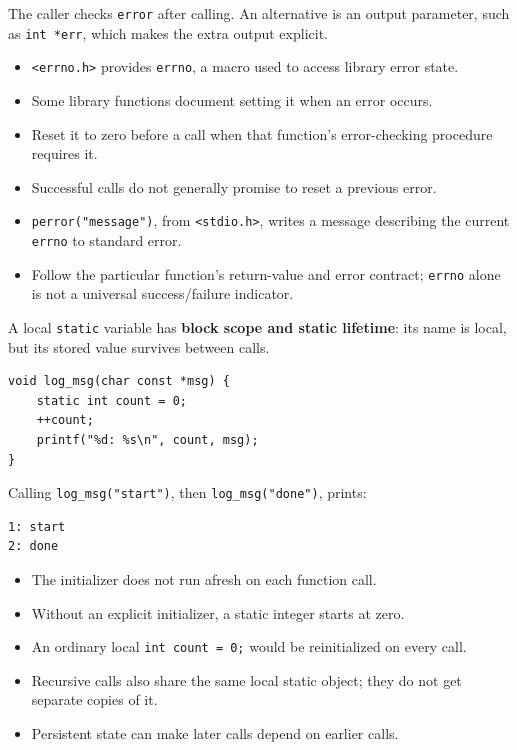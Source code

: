 \documentclass[11pt,a4paper]{article}
\providecommand{\tightlist}{\setlength{\itemsep}{0pt}\setlength{\parskip}{0pt}}
\begin{document}
The caller checks \texttt{error} after calling. An alternative is an output parameter, such as \texttt{int\ *err}, which makes the extra output explicit.

\label{library-error-state-errno}
\hypertarget{library-error-state-errno}{}

\begin{itemize}
\tightlist
\item
  \texttt{\textless{}errno.h\textgreater{}} provides \texttt{errno}, a macro used to access library error state.
\item
  Some library functions document setting it when an error occurs.
\item
  Reset it to zero before a call when that function's error-checking procedure requires it.
\item
  Successful calls do not generally promise to reset a previous error.
\item
  \texttt{perror("message")}, from \texttt{\textless{}stdio.h\textgreater{}}, writes a message describing the current \texttt{errno} to standard error.
\item
  Follow the particular function's return-value and error contract; \texttt{errno} alone is not a universal success/failure indicator.
\end{itemize}

\label{local-static-variables}
\hypertarget{local-static-variables}{}

A local \texttt{static} variable has \textbf{block scope and static lifetime}: its name is local, but its stored value survives between calls.

\begin{lstlisting}[style=cscode]
void log_msg(char const *msg) {
    static int count = 0;
    ++count;
    printf("%d: %s\n", count, msg);
}
\end{lstlisting}

Calling \texttt{log\_msg("start")}, then \texttt{log\_msg("done")}, prints:

\begin{lstlisting}[style=plaincode]
1: start
2: done
\end{lstlisting}

\begin{itemize}
\tightlist
\item
  The initializer does not run afresh on each function call.
\item
  Without an explicit initializer, a static integer starts at zero.
\item
  An ordinary local \texttt{int\ count\ =\ 0;} would be reinitialized on every call.
\item
  Recursive calls also share the same local static object; they do not get separate copies of it.
\item
  Persistent state can make later calls depend on earlier calls.
\end{itemize}
\end{document}
